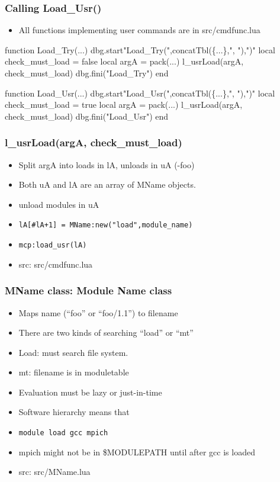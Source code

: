 \documentclass{beamer}
\begin{document}
\begin{frame}[fragile]
    \frametitle{Calling Load\_Usr()}
  \begin{itemize}
    \item All functions implementing user commands are in src/cmdfunc.lua
  \end{itemize}

 {\tiny
    \begin{semiverbatim}
function Load\_Try(...)
   dbg.start{"Load\_Try(",concatTbl(\{...\},", "),")"}
   local check\_must\_load = false
   local argA            = pack(...)
   l\_usrLoad(argA, check\_must\_load)
   dbg.fini("Load\_Try")
end

function Load\_Usr(...)
   dbg.start{"Load\_Usr(",concatTbl(\{...\},", "),")"}
   local check\_must\_load = true
   local argA            = pack(...)
   l\_usrLoad(argA, check\_must\_load)
   dbg.fini("Load\_Usr")
end
    \end{semiverbatim}
}
\end{frame}

\begin{frame}[fragile]
    \frametitle{l\_usrLoad(argA, check\_must\_load)}
  \begin{itemize}
    \item Split argA into loads in lA, unloads in uA (-foo)
    \item Both uA and lA are an array of MName objects.
    \item unload modules in uA 
    \item {\color{blue} \texttt{lA[\#lA+1] = MName:new("load",module\_name)}}
    \item {\color{blue} \texttt{mcp:load\_usr(lA)}}
    \item src: src/cmdfunc.lua
  \end{itemize}
\end{frame}

\begin{frame}[fragile]
    \frametitle{MName class: Module Name class}
 {\tiny
    \begin{semiverbatim}
    \end{semiverbatim}
}
  \begin{itemize}
    \item Maps name (``foo'' or ``foo/1.1'') to filename
    \item There are two kinds of searching ``load'' or ``mt''
    \item Load: must search file system. 
    \item mt: filename is in moduletable
    \item Evaluation must be lazy or just-in-time
    \item Software hierarchy means that 
    \item {\color{blue}\texttt{module load gcc mpich}}
    \item mpich might not be in \$MODULEPATH until after gcc is loaded
    \item src: src/MName.lua
  \end{itemize}

\end{frame}
\end{document}
